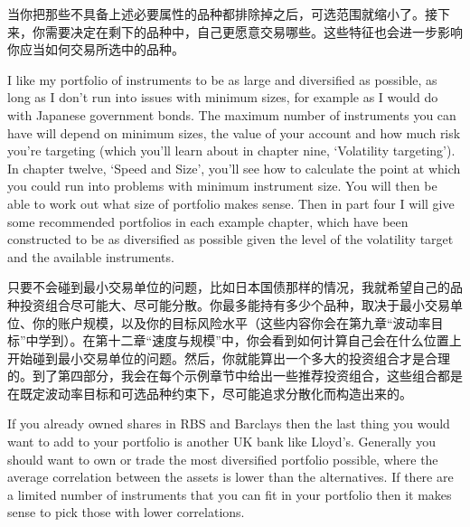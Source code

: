 \begin{chineseblock}当你把那些不具备上述必要属性的品种都排除掉之后，可选范围就缩小了。接下来，你需要决定在剩下的品种中，自己更愿意交易哪些。这些特征也会进一步影响你应当如何交易所选中的品种。\end{chineseblock}


\begin{englishblock} I like my portfolio of instruments to be as large and diversified as possible, as long as I don't run into issues with minimum sizes, for example as I would do with Japanese government bonds. The maximum number of instruments you can have will depend on minimum sizes, the value of your account and how much risk you're targeting (which you'll learn about in chapter nine, ‘Volatility targeting'). In chapter twelve, ‘Speed and Size', you'll see how to calculate the point at which you could run into problems with minimum instrument size. You will then be able to work out what size of portfolio makes sense. Then in part four I will give some recommended portfolios in each example chapter, which have been constructed to be as diversified as possible given the level of the volatility target and the available instruments. \end{englishblock}

\begin{chineseblock}只要不会碰到最小交易单位的问题，比如日本国债那样的情况，我就希望自己的品种投资组合尽可能大、尽可能分散。你最多能持有多少个品种，取决于最小交易单位、你的账户规模，以及你的目标风险水平（这些内容你会在第九章“波动率目标”中学到）。在第十二章“速度与规模”中，你会看到如何计算自己会在什么位置上开始碰到最小交易单位的问题。然后，你就能算出一个多大的投资组合才是合理的。到了第四部分，我会在每个示例章节中给出一些推荐投资组合，这些组合都是在既定波动率目标和可选品种约束下，尽可能追求分散化而构造出来的。\end{chineseblock}


\begin{englishblock} If you already owned shares in RBS and Barclays then the last thing you would want to add to your portfolio is another UK bank like Lloyd's. Generally you should want to own or trade the most diversified portfolio possible, where the average correlation between the assets is lower than the alternatives. If there are a limited number of instruments that you can fit in your portfolio then it makes sense to pick those with lower correlations. \end{englishblock}

